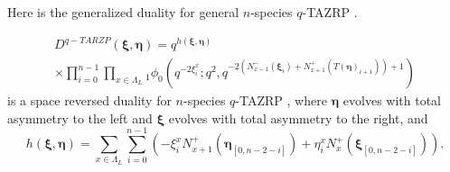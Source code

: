 \documentclass{ximera}
\begin{document}
Here is the generalized duality for general $n$-species  $q$-TAZRP .
\begin{theorem}
\begin{multline}
D^{q-TARZP}(\boldsymbol\xi,\boldsymbol\eta) =     q^{h(\boldsymbol\xi,\boldsymbol\eta)}\\
\times\prod_{i=0}^{n-1}\prod_{x\in\Lambda_L}{}_1\phi_0\left(q^{-2\xi_i^x};q^2,q^{-2\left(N_{x-1}^-(\boldsymbol\xi_i)+N_{x+1}^+(T(\boldsymbol\eta)_{i+1})\right)+1}\right)
\end{multline}
is a space reversed duality for $n $-species $q$-TAZRP , where $\boldsymbol\eta$ evolves with total asymmetry to the left and $\boldsymbol\xi$ evolves with total asymmetry to the right, and 
\begin{equation}\label{eq:2}
    h(\boldsymbol\xi,\boldsymbol\eta)=\sum_{x \in \Lambda_L }\sum_{i=0}^{n-1}\left(-\xi_i^xN_{x+1}^+(\boldsymbol\eta_{[0,n-2-i]})+\eta_i^xN_{x}^+(\boldsymbol\xi_{[0,n-2-i]})\right).
\end{equation}
\end{theorem}
\end{document}
